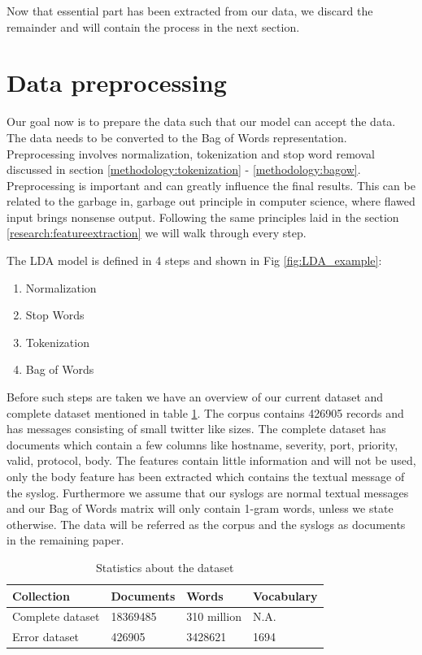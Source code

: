 Now that essential part has been extracted from our data, we discard the remainder and will contain the process in the next section. 


\section{Data preprocessing}\label{methodology:Text preprocessing}
Our goal now is to prepare the data such that our model can accept the data. The data needs to be converted to the Bag of Words representation. Preprocessing involves normalization, tokenization and stop word removal discussed in section \ref{methodology:tokenization} - \ref{methodology:bagow}. Preprocessing is important and can greatly influence the final results. This can be related to the garbage in, garbage out principle in computer science, where flawed input brings nonsense output. Following the same principles laid in the section \ref{research:featureextraction} we will walk through every step.

The LDA model is defined in 4 steps and shown in Fig \ref{fig:LDA_example}:
\begin{enumerate}
    \item Normalization
    \item Stop Words
    \item Tokenization
    \item Bag of Words
\end{enumerate}

Before such steps are taken we have an overview of our current dataset and complete dataset mentioned in table \ref{tab:tablestatistics}. The corpus contains 426905 records and has messages consisting of small twitter like sizes. The complete dataset has documents which contain a few columns like hostname, severity, port, priority, valid, protocol, body. The features contain little information and will not be used, only the body feature has been extracted which contains the textual message of the syslog. Furthermore we assume that our syslogs are normal textual messages and our Bag of Words matrix will only contain 1-gram words, unless we state otherwise.  
The data will be referred as the corpus and the syslogs as documents in the remaining paper. 


\begin{table}[h]
\centering
 \begin{tabular}{|l|l|l|l|} 
 \hline
 Collection & Documents & Words & Vocabulary  \\ [0.5ex] 
 \hline\hline
 Complete dataset & 18369485 & 310 million & N.A.  \\ 
 Error dataset & 426905 & 3428621 & 1694 \\
 \hline
 \end{tabular}
\caption{Statistics about the dataset}
\label{tab:tablestatistics}
\end{table}

